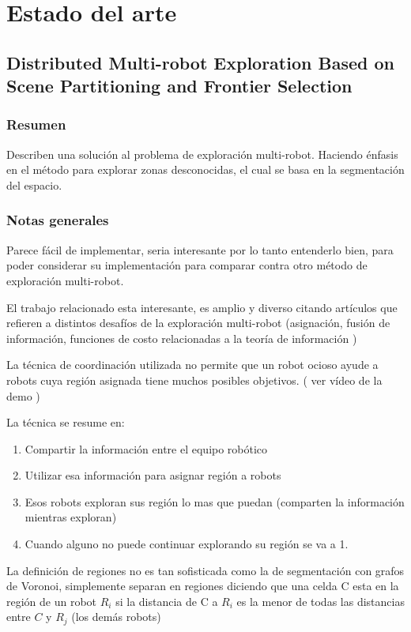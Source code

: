 \section{Estado del arte}

\subsection{Distributed Multi-robot Exploration Based on Scene Partitioning and Frontier Selection}

\subsubsection{Resumen}
Describen una solución al problema de exploración multi-robot. Haciendo énfasis en el método para explorar zonas desconocidas, el cual se basa en la segmentación del espacio.

\subsubsection{Notas generales}
Parece fácil de implementar, seria interesante por lo tanto entenderlo bien, para poder considerar su implementación para comparar contra otro método de exploración multi-robot.

El trabajo relacionado esta interesante, es amplio y diverso citando artículos que refieren a distintos desafíos de la exploración multi-robot (asignación, fusión de información, funciones de costo relacionadas a la teoría de información )

La técnica de coordinación utilizada no permite que un robot ocioso ayude a robots cuya región asignada tiene muchos posibles objetivos. ( ver vídeo de la demo )

La técnica se resume en:
\begin{enumerate}
  \item Compartir la información entre el equipo robótico
  \item Utilizar esa información para asignar región a robots
  \item Esos robots exploran sus región lo mas que puedan (comparten la información mientras exploran)
  \item Cuando alguno no puede continuar explorando su región se va a 1.
\end{enumerate}

La definición de regiones no es tan sofisticada como la de segmentación con grafos de Voronoi, simplemente separan en regiones diciendo que una celda C esta en la región de un robot $R_i$ si la distancia de C a $R_i$ es la menor de todas las distancias entre $C$ y $R_j$ (los demás robots)

